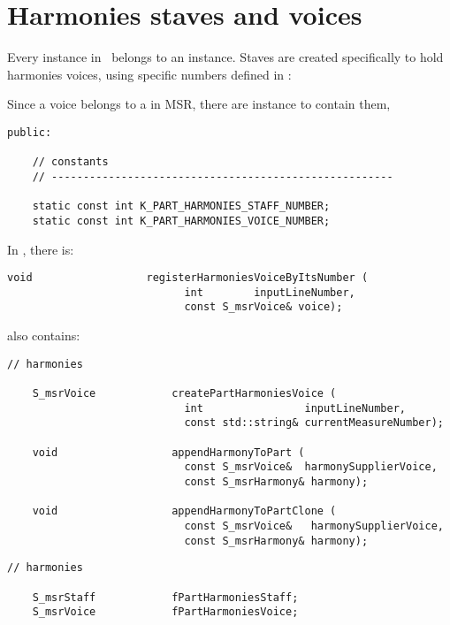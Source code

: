 \section{Harmonies staves and voices}

Every  instance in \mf\ belongs to an  instance. Staves are created specifically to hold harmonies voices, using specific numbers defined in :

Since a voice belongs to a  in MSR, there are  instance to contain them,

\begin{lstlisting}[language=CPlusPlus]
  public:

    // constants
    // ------------------------------------------------------

    static const int K_PART_HARMONIES_STAFF_NUMBER;
    static const int K_PART_HARMONIES_VOICE_NUMBER;
\end{lstlisting}

In , there is:
\begin{lstlisting}[language=CPlusPlus]
    void                  registerHarmoniesVoiceByItsNumber (
                            int        inputLineNumber,
                            const S_msrVoice& voice);
\end{lstlisting}

 also contains:
\begin{lstlisting}[language=CPlusPlus]
   // harmonies

    S_msrVoice            createPartHarmoniesVoice (
                            int                inputLineNumber,
                            const std::string& currentMeasureNumber);

    void                  appendHarmonyToPart (
                            const S_msrVoice&  harmonySupplierVoice,
                            const S_msrHarmony& harmony);

    void                  appendHarmonyToPartClone (
                            const S_msrVoice&   harmonySupplierVoice,
                            const S_msrHarmony& harmony);
\end{lstlisting}

\begin{lstlisting}[language=CPlusPlus]
    // harmonies

    S_msrStaff            fPartHarmoniesStaff;
    S_msrVoice            fPartHarmoniesVoice;
\end{lstlisting}


